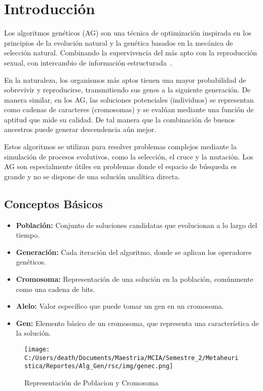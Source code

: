 \section{Introducción}

Los algoritmos genéticos (AG) son una técnica de optimización inspirada en los principios de la evolución natural y la genética
basados en la mecánica de selección natural. Combinando la supervivencia del más apto con la reproducción sexual, con intercambio
de información estructurada~\cite{marcos2010introduccion}. 

En la naturaleza, los organismos más aptos tienen una mayor probabilidad de sobrevivir y reproducirse, transmitiendo sus genes
a la siguiente generación. De manera similar, en los AG, las soluciones potenciales (individuos) se representan como cadenas de
caracteres (cromosomas) y se evalúan mediante una función de aptitud que mide su calidad. De tal manera que la combinación de buenos
ancestros puede generar descendencia aún mejor.

Estos algoritmos se utilizan para resolver problemas complejos mediante
la simulación de procesos evolutivos, como la selección, el cruce y la mutación. Los AG son especialmente útiles en problemas donde el espacio de búsqueda es grande y no se dispone de
una solución analítica directa.

\subsection{Conceptos Básicos}
\begin{itemize}
    \item \textbf{Población:} Conjunto de soluciones candidatas que evolucionan a lo largo del tiempo.
    \item \textbf{Generación:} Cada iteración del algoritmo, donde se aplican los operadores genéticos.
    \item \textbf{Cromosoma:} Representación de una solución en la población, comúnmente como una cadena de bits.
    \item \textbf{Alelo:} Valor específico que puede tomar un gen en un cromosoma.
    \item \textbf{Gen:} Elemento básico de un cromosoma, que representa una característica de la solución.
\end{itemize}

\begin{figure} [H]
    \centering
    \texttt{[image: C:/Users/death/Documents/Maestria/MCIA/Semestre\_2/Metaheuristica/Reportes/Alg\_Gen/rsc/img/genec.png]}
    \caption{Representación de Poblacion y Cromosoma}\label{Poblacion}
\end{figure}

